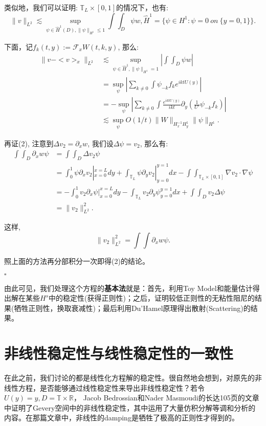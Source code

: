 类似地，我们可以证明: $\mathbb{T}_{L}\times[0,1]$的情况下，也有:
\begin{equation}
\|v\|_{L^2}\lesssim\sup_{\psi\in \hat{H}^1(D), \|\psi\|_{H^1}\leq 1}\int\int_D\psi w, \hat{H}^{1}=\{\psi\in H^1:\psi=0~on~\{y=0,1\}\}.
\end{equation}

下面，记$f_k(t,y):=\mathcal{F}_x W(t,k,y)$, 那么:
\[
\begin{aligned}
\|v-<v>_x\|_{L^2}&\lesssim \sup_{\psi\in\hat{H}^1,\|\psi\|_{H^1}=1}\left|\int\int_D\psi w\right|\\
&=\sup_{\psi}\left|\sum_{k\neq 0}\int\psi_{-k}f_k e^{iktU(y)}\right| \\
&=-\sup_{\psi}\left|\sum_{k\neq 0}\int \frac{e^{iktU(y)}}{ikt}\partial_y(\frac{1}{U'}\psi_{-k}f_{k})\right|\\
&\lesssim\sup_{\psi}O(1/t)\|W\|_{H_x^{-1}H_y^1}\|\psi\|_{H^1}.
\end{aligned}
\]

再证(2), 注意到$\Delta v_2=\partial_x w$, 我们设$\Delta\psi=v_2$, 那么有:
\[
\begin{aligned}
\int\int_D\partial_x w\psi&=\int\int_{D}\Delta v_2\psi \\
&=\int_0^1\psi\partial_x v_2|_{x=0}^{x=L}dy+\int_{\mathbb{T}_L}\psi\partial_y v_2|_{y=0}^{y=1}dx-\int\int_{\mathbb{T}_L\times [0,1]}\nabla v_2\cdot\nabla\psi \\
&=-\int_0^1v_2\partial_x\psi|_{x=0}^{x=L}dy-\int_{\mathbb{T}_L}v_2\partial_y\psi_{y=0}^{y=1}dx+\int\int_Dv_2\Delta\psi\\
&=\|v_2\|_{L^2}^2.
\end{aligned}
\]

这样, $$\|v_2\|_{L^2}^2=\int\int\partial_x w\psi.$$

照上面的方法再分部积分一次即得(2)的结论。
\begin{flushright}
$\square$
\end{flushright}

由此可见，我们处理这个方程的\textbf{基本法}就是：首先，利用Toy Model和能量估计得出解在某些$H^s$中的稳定性(获得正则性)；之后，证明较低正则性的无粘性阻尼的结果(牺牲正则性，换取衰减性)；最后利用Du'Hamel原理得出散射(Scattering)的结果。


\section{非线性稳定性与线性稳定性的一致性}

在此之前，我们讨论的都是线性化方程解的稳定性。很自然地会想到，对原先的非线性方程，是否能够通过线性稳定性来导出非线性稳定性？若令$U(y)=y, D=\mathbb{T}\times\mathbb{R}$， Jacob Bedrossian和Nader Masmoudi的长达105页的文章中证明了Gevery空间中的非线性稳定性，其中运用了大量仿积分解等调和分析的内容。在那篇文章中，非线性的damping是牺牲了极高的正则性才得到的。


